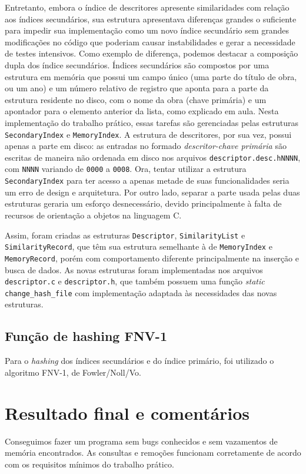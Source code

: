\documentclass[a4paper,10pt]{article}
\begin{document}
Entretanto, embora o índice de descritores apresente similaridades com relação aos índices secundários, sua estrutura apresentava diferenças grandes o suficiente para impedir sua implementação como um novo índice secundário sem grandes modificações no código que poderiam causar instabilidades e gerar a necessidade de testes intensivos. Como exemplo de diferença, podemos destacar a composição dupla dos índice secundários. Índices secundários são compostos por uma estrutura em memória que possui um campo único (uma parte do título de obra, ou um ano) e um número relativo de registro que aponta para a parte da estrutura residente no disco, com o nome da obra (chave primária) e um apontador para o elemento anterior da lista, como explicado em aula. Nesta implementação do trabalho prático, essas tarefas são gerenciadas pelas estruturas \texttt{SecondaryIndex} e \texttt{MemoryIndex}. A estrutura de descritores, por sua vez, possui apenas a parte em disco: as entradas no formado \textit{descritor-chave primária} são escritas de maneira não ordenada em disco nos arquivos \texttt{descriptor.desc.hNNNN}, com \texttt{NNNN} variando de \texttt{0000} a \texttt{0008}. Ora, tentar utilizar a estrutura \texttt{SecondaryIndex} para ter acesso a apenas metade de suas funcionalidades seria um erro de design e arquitetura. Por outro lado, separar a parte usada pelas duas estruturas geraria um esforço desnecessário, devido principalmente à falta de recursos de orientação a objetos na linguagem C.

Assim, foram criadas as estruturas \texttt{Descriptor}, \texttt{SimilarityList} e \texttt{SimilarityRecord}, que têm sua estrutura semelhante à de \texttt{MemoryIndex} e \texttt{MemoryRecord}, porém com comportamento diferente principalmente na inserção e busca de dados. As novas estruturas foram implementadas nos arquivos \texttt{descriptor.c} e \texttt{descriptor.h}, que também possuem uma função \textit{static} \texttt{change\_hash\_file} com implementação adaptada às necessidades das novas estruturas.

\subsection{Função de hashing FNV-1}
Para o \textit{hashing} dos índices secundários e do índice primário, foi utilizado o algoritmo FNV-1, de Fowler/Noll/Vo.

\section{Resultado final e comentários}
Conseguimos fazer um programa sem bugs conhecidos e sem vazamentos de memória encontrados. As consultas e remoções funcionam corretamente de acordo com os requisitos mínimos do trabalho prático.
\end{document}
